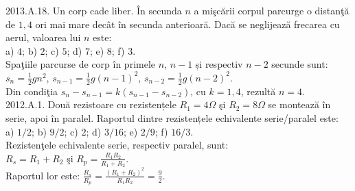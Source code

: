 2013.A.18. Un corp cade liber. În secunda $n$ a mişcării corpul parcurge o distanţă de $1,4$ ori mai mare decât în secunda anterioară. Dacă se neglijează frecarea cu aerul, valoarea lui $n$ este:\\ a) $4$; b) $2$; c) $5$; d) $7$; e) $8$; f) $3$.\\ Spaţiile parcurse de corp în primele $n$, $n-1$ și respectiv $n-2$ secunde sunt: $s_{n}=\frac{1}{2} g n^{2}$, $s_{n-1}=\frac{1}{2} g(n-1)^{2}$, $s_{n-2}=\frac{1}{2} g(n-2)^{2}$.\\ Din condiţia $s_{n}-s_{n-1}=k\left(s_{n-1}-s_{n-2}\right)$, cu $k=1,4$, rezultă $n=4$.\\


2012.A.1. Două rezistoare cu rezistențele $R_{1}=4 \Omega$ şi $R_{2}=8 \Omega$ se montează în serie, apoi în paralel. Raportul dintre rezistențele echivalente serie/paralel este:\\ a) $1 / 2$; b) $9 / 2$; c) $2$; d) $3 / 16$; e) $2 / 9$; f) $16 / 3$.\\ Rezistenţele echivalente serie, respectiv paralel, sunt:\\ $R_{s}=R_{1}+R_{2}$ şi $R_{p}=\frac{R_{1} R_{2}}{R_{1}+R_{2}}$.\\ Raportul lor este: $\frac{R_{s}}{R_{p}}=\frac{\left(R_{1}+R_{2}\right)^{2}}{R_{1} R_{2}}=\frac{9}{2}$.\\

